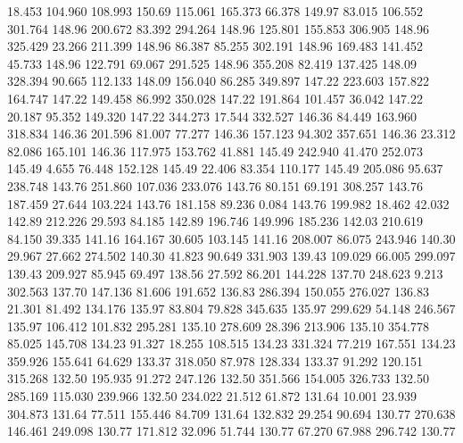   18.453  104.960  108.993       150.69
 115.061  165.373   66.378       149.97
  83.015  106.552  301.764       148.96
 200.672   83.392  294.264       148.96
 125.801  155.853  306.905       148.96
 325.429   23.266  211.399       148.96
  86.387   85.255  302.191       148.96
 169.483  141.452   45.733       148.96
 122.791   69.067  291.525       148.96
 355.208   82.419  137.425       148.09
 328.394   90.665  112.133       148.09
 156.040   86.285  349.897       147.22
 223.603  157.822  164.747       147.22
 149.458   86.992  350.028       147.22
 191.864  101.457   36.042       147.22
  20.187   95.352  149.320       147.22
 344.273   17.544  332.527       146.36
  84.449  163.960  318.834       146.36
 201.596   81.007   77.277       146.36
 157.123   94.302  357.651       146.36
  23.312   82.086  165.101       146.36
 117.975  153.762   41.881       145.49
 242.940   41.470  252.073       145.49
   4.655   76.448  152.128       145.49
  22.406   83.354  110.177       145.49
 205.086   95.637  238.748       143.76
 251.860  107.036  233.076       143.76
  80.151   69.191  308.257       143.76
 187.459   27.644  103.224       143.76
 181.158   89.236    0.084       143.76
 199.982   18.462   42.032       142.89
 212.226   29.593   84.185       142.89
 196.746  149.996  185.236       142.03
 210.619   84.150   39.335       141.16
 164.167   30.605  103.145       141.16
 208.007   86.075  243.946       140.30
  29.967   27.662  274.502       140.30
  41.823   90.649  331.903       139.43
 109.029   66.005  299.097       139.43
 209.927   85.945   69.497       138.56
  27.592   86.201  144.228       137.70
 248.623    9.213  302.563       137.70
 147.136   81.606  191.652       136.83
 286.394  150.055  276.027       136.83
  21.301   81.492  134.176       135.97
  83.804   79.828  345.635       135.97
 299.629   54.148  246.567       135.97
 106.412  101.832  295.281       135.10
 278.609   28.396  213.906       135.10
 354.778   85.025  145.708       134.23
  91.327   18.255  108.515       134.23
 331.324   77.219  167.551       134.23
 359.926  155.641   64.629       133.37
 318.050   87.978  128.334       133.37
  91.292  120.151  315.268       132.50
 195.935   91.272  247.126       132.50
 351.566  154.005  326.733       132.50
 285.169  115.030  239.966       132.50
 234.022   21.512   61.872       131.64
  10.001   23.939  304.873       131.64
  77.511  155.446   84.709       131.64
 132.832   29.254   90.694       130.77
 270.638  146.461  249.098       130.77
 171.812   32.096   51.744       130.77
  67.270   67.988  296.742       130.77
